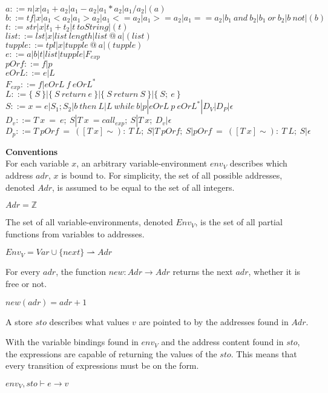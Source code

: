 {$a ::= n | x | a_1+a_2 | a_1-a_2 | a_1*a_2 | a_1/a_2 | (a)$\\
$b ::= tf| x | a_1<a_2 | a_1>a_2 | a_1<=a_2| a_1>=a_2| a_1==a_2 | b_1\ and\ b_2 | b_1\ or\ b_2 | b\ not | (b)$\\
$t ::= str| x | t_1 + t_2 | t\ toString | (t)$\\
$list ::= lst | x | list\ length | list\ @\ a | (list)$\\
$tupple ::= tpl | x | tupple\ @\ a| (tupple)$\\
$e ::= a | b | t | list | tupple | F_{exp}$\\
$pOrf ::= f | p$\\
$eOrL ::= e | L$\\
$F_{exp} ::= f | eOrL\ f\ eOrL^*$\\
$L ::= \{\ S\ \} | \{\ S\ return\ e\ \} | \{\ S\ return\ S\ \} | \{\ S;\ e\ \}$\\
$S ::= x = e | S_1;S_2 | b\ then\ L | L\ while\ b | p | eOrL\ p\ eOrL^* | D_V | D_P | \epsilon$\\
$D_v ::= T\ x\ =\ e;\ S | T\ x\ = call_{exp};\ S | T\ x;\ D_v | \epsilon$\\
$D_p ::= T\ pOrf\ =\ ([T\ x]\sim):\ T\ L;\ S |T\ pOrf;\ S | pOrf\ =\ ([T\ x]\sim):\ T\ L;\ S | \epsilon$

\textbf{\large{Conventions}} \\
For each variable $x$, an arbitrary variable-environment $env_V$ describes which address $adr$, $x$ is bound to.
For simplicity, the set of all possible addresses, denoted $Adr$, is assumed to be equal to the set of all integers.
\begin{center}
	$Adr = \mathbb{Z}$
\end{center}
The set of all variable-environments, denoted \textbf{$Env_V$}, is the set of all partial functions from variables to addresses.
\begin{center}
	$Env_V = Var \cup \{next\} \rightharpoonup Adr$
\end{center}
For every $adr$, the function $new : Adr \rightarrow Adr$ returns the next $adr$, whether it is free or not.
\begin{center}
	$new (adr) = adr + 1$
\end{center}
A store $sto$ describes what values $v$ are pointed to by the addresses found in $Adr$.

With the variable bindings found in $env_V$ and the address content found in $sto$, the expressions are capable of returning the values of the $sto$.
This means that every transition of expressions must be on the form.
\begin{center}
	$env_V,sto \vdash e \rightarrow v$
\end{center} 

}
